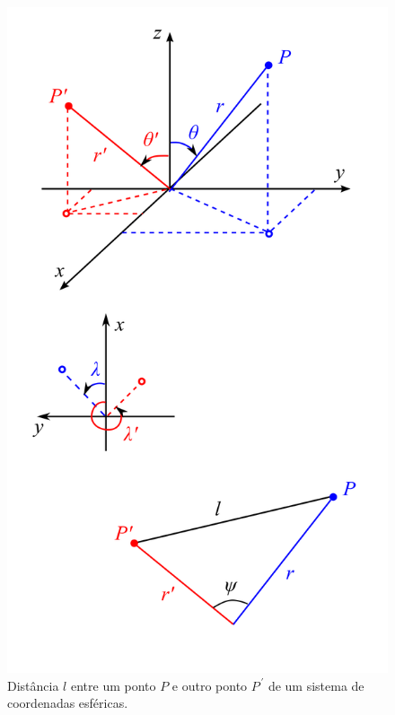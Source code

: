 \documentclass[10pt,a4paper,fleqn]{article}
\begin{document}
\begin{figure}[h]
    \centering
    \includegraphics[scale=1]{Figs/Fig3.png}
    \caption{Dist\^{a}ncia $l$ entre um ponto $P$ e outro ponto $P^{\,\prime}$ 
    de um sistema de coordenadas esféricas.}   
    \label{fig:fig3}
\end{figure}
\end{document}
